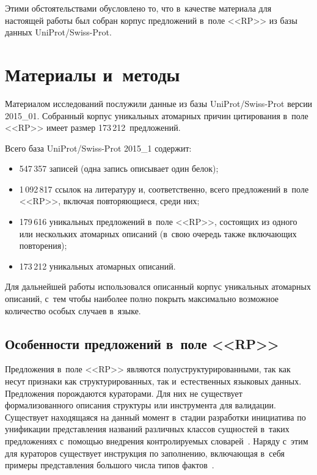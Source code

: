 \begin{multicols}{2}
  Этими обстоятельствами обусловлено то, что в~качестве материала для 
настоящей работы был собран корпус предложений в~поле <<RP>> из базы 
данных UniProt/Swiss-Prot.

\vspace*{-9pt}
  
  \section{Материалы и~методы}
  
  Материалом исследований послужили данные из базы UniProt/Swiss-Prot 
версии 2015\_01. Собранный корпус уникальных атомарных причин 
цитирования в~поле <<RP>> имеет размер 173\,212~предложений.
  
  Всего база UniProt/Swiss-Prot 2015\_1 содержит:
  \begin{itemize}
\item 547\,357 записей (одна запись описывает один белок);
\item 1\,092\,817 ссылок на литературу и, соответственно, всего предложений 
в~поле <<RP>>, включая повторяющиеся, среди них;
\item 179\,616 уникальных предложений в~поле <<RP>>, состоящих из одного или 
нескольких атомарных описаний (в~свою очередь также вклю\-ча\-ющих 
повторения);
\item 173\,212 уникальных атомарных описаний.
\end{itemize}

  Для дальнейшей работы использовался описанный корпус уникальных 
атомарных описаний, с~тем чтобы наиболее полно покрыть максимально 
возможное количество особых случаев в~языке.

  
  \subsection{Особенности предложений в~поле <<RP>>}
  
    \vspace*{-2pt}
  
  Предложения в~поле <<RP>> являются полуструктурированными, так как несут 
признаки как структурированных, так и~естественных языковых данных. 
Предложения порождаются кураторами. Для них не существует 
формализованного описания структуры или инструмента для валидации. 
Существует находящаяся на данный момент в~стадии разработки
инициатива по унификации представления названий различных классов 
сущностей в~таких предложениях с~помощью внедрения контро\-ли\-ру\-емых 
словарей~\cite{13-al}. Наряду с~этим для кураторов существует инструкция по заполнению, 
вклю\-ча\-ющая в~себя примеры представления большого числа типов 
фактов~\cite{14-al}.
  

\end{multicols}
